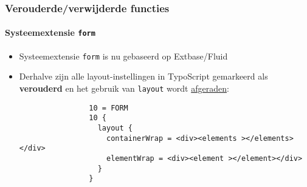 \begin{frame}[fragile]
	\frametitle{Verouderde/verwijderde functies}
	\framesubtitle{Systeemextensie \texttt{form}}

	\begin{itemize}

		\item Systeemextensie \texttt{form} is nu gebaseerd op Extbase/Fluid

		\item Derhalve zijn alle layout-instellingen in TypoScript gemarkeerd als
			\textbf{verouderd} en het gebruik van \texttt{layout} wordt \underline{afgeraden}:

			\begin{lstlisting}
				10 = FORM
				10 {
				  layout {
				    containerWrap = <div><elements ></elements></div>
				    elementWrap = <div><element ></element></div>
				  }
				}
			\end{lstlisting}

	\end{itemize}

\end{frame}


